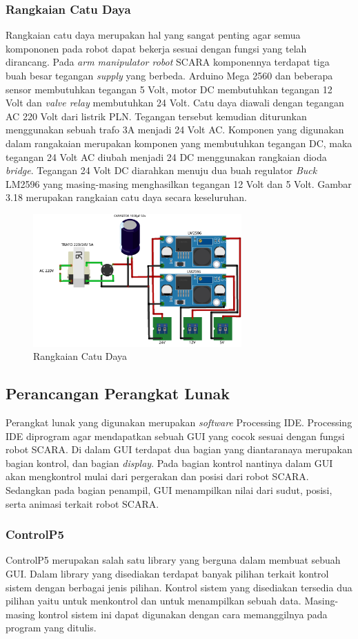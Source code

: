\subsubsection{Rangkaian Catu Daya}
Rangkaian catu daya merupakan hal yang sangat penting agar semua kompononen pada robot dapat bekerja sesuai dengan fungsi yang telah dirancang. Pada \textit{arm manipulator robot} SCARA komponennya terdapat tiga buah besar tegangan \textit{supply} yang berbeda. Arduino Mega 2560 dan beberapa sensor membutuhkan tegangan 5 Volt, motor DC membutuhkan tegangan 12 Volt dan \textit{valve relay} membutuhkan 24 Volt. Catu daya diawali dengan tegangan AC 220 Volt dari listrik PLN. Tegangan tersebut kemudian diturunkan menggunakan sebuah trafo 3A menjadi 24 Volt AC. Komponen yang digunakan dalam rangakaian merupakan komponen yang membutuhkan tegangan DC, maka tegangan 24 Volt AC diubah menjadi 24 DC menggunakan rangkaian dioda \textit{bridge}. Tegangan 24 Volt DC diarahkan menuju dua buah regulator \textit{Buck} LM2596 yang masing-masing menghasilkan tegangan 12 Volt dan 5 Volt. Gambar 3.18 merupakan rangkaian catu daya secara keseluruhan.
\begin{figure}[H]
	\centering
	\includegraphics[width=8cm]{gambar/catudaya_bb.png}
	\caption{Rangkaian Catu Daya}
\end{figure}
\subsection{Perancangan Perangkat Lunak}
Perangkat lunak yang digunakan merupakan \textit{software} Processing IDE. Processing IDE diprogram agar mendapatkan sebuah GUI yang cocok sesuai dengan fungsi robot SCARA. Di dalam GUI terdapat dua bagian yang diantaranaya merupakan bagian kontrol, dan bagian \textit{display}. Pada bagian kontrol nantinya dalam GUI akan mengkontrol mulai dari pergerakan dan posisi dari robot SCARA. Sedangkan pada bagian penampil, GUI menampilkan nilai dari sudut, posisi, serta animasi terkait robot SCARA.
\subsubsection{ControlP5}
ControlP5 merupakan salah satu library yang berguna dalam membuat sebuah GUI. Dalam library yang disediakan terdapat banyak pilihan terkait kontrol sistem dengan berbagai jenis pilihan. Kontrol sistem yang disediakan tersedia dua pilihan yaitu untuk menkontrol dan untuk menampilkan sebuah data. Masing-masing kontrol sistem ini dapat digunakan dengan cara memanggilnya pada program yang ditulis.

